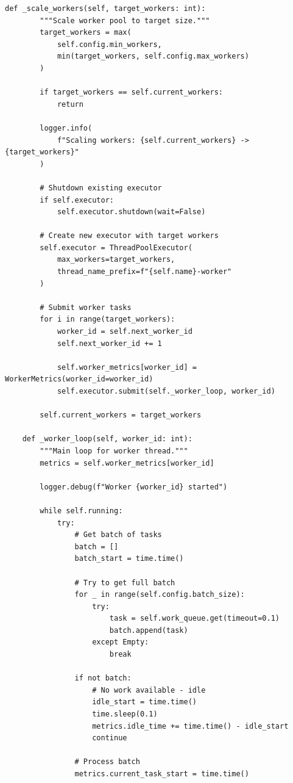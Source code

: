 \begin{lstlisting}[style=python, caption={Parallel Processor with Dynamic Allocation}]
    def _scale_workers(self, target_workers: int):
        """Scale worker pool to target size."""
        target_workers = max(
            self.config.min_workers,
            min(target_workers, self.config.max_workers)
        )

        if target_workers == self.current_workers:
            return

        logger.info(
            f"Scaling workers: {self.current_workers} -> {target_workers}"
        )

        # Shutdown existing executor
        if self.executor:
            self.executor.shutdown(wait=False)

        # Create new executor with target workers
        self.executor = ThreadPoolExecutor(
            max_workers=target_workers,
            thread_name_prefix=f"{self.name}-worker"
        )

        # Submit worker tasks
        for i in range(target_workers):
            worker_id = self.next_worker_id
            self.next_worker_id += 1

            self.worker_metrics[worker_id] = WorkerMetrics(worker_id=worker_id)
            self.executor.submit(self._worker_loop, worker_id)

        self.current_workers = target_workers

    def _worker_loop(self, worker_id: int):
        """Main loop for worker thread."""
        metrics = self.worker_metrics[worker_id]

        logger.debug(f"Worker {worker_id} started")

        while self.running:
            try:
                # Get batch of tasks
                batch = []
                batch_start = time.time()

                # Try to get full batch
                for _ in range(self.config.batch_size):
                    try:
                        task = self.work_queue.get(timeout=0.1)
                        batch.append(task)
                    except Empty:
                        break

                if not batch:
                    # No work available - idle
                    idle_start = time.time()
                    time.sleep(0.1)
                    metrics.idle_time += time.time() - idle_start
                    continue

                # Process batch
                metrics.current_task_start = time.time()


\end{lstlisting}
